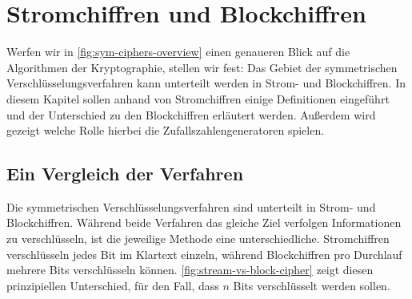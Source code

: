\chapter{Stromchiffren und Blockchiffren}



\noindent
Werfen wir in \autoref{fig:sym-ciphers-overview} einen genaueren Blick auf die Algorithmen
der Kryptographie, stellen wir fest: Das Gebiet
der symmetrischen Verschlüsselungsverfahren kann unterteilt werden in Strom- und Blockchiffren.
In diesem Kapitel sollen anhand von Stromchiffren einige Definitionen eingeführt
und der Unterschied zu den Blockchiffren erläutert werden.
Außerdem wird gezeigt welche Rolle hierbei die Zufallszahlengeneratoren spielen.

\section{Ein Vergleich der Verfahren}
Die symmetrischen Verschlüsselungsverfahren sind unterteilt in Strom- und Blockchiffren.
Während beide Verfahren das gleiche Ziel verfolgen Informationen zu verschlüsseln,
ist die jeweilige
Methode eine unterschiedliche. Stromchiffren verschlüsseln jedes Bit im Klartext einzeln,
während Blockchiffren pro Durchlauf mehrere Bits verschlüsseln können.
\autoref{fig:stream-vs-block-cipher} zeigt diesen prinzipiellen Unterschied, für den Fall, dass
$n$ Bits verschlüsselt werden sollen.



